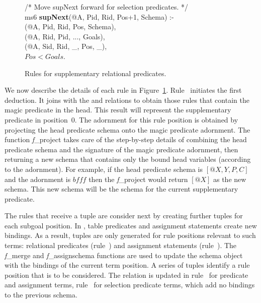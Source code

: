 \begin{figure}[!t]
\begin{boxedminipage}{\linewidth}
/* Move supNext forward for selection predicates. */ \\
ms6 {\bf supNext}(@A, Pid, Rid, Pos+1, Schema) :- \\
(@A, Pid, Rid, Pos, Schema), \\
(@A, Rid, Pid, ..., Goals), \\
(@A, Sid, Rid, \_, Pos, \_), \\
\datalogspace $Pos < Goals$. 
\end{boxedminipage}
\caption{\label{ch:magic:fig:magic2}Rules for supplementary relational predicates.}
\end{figure}

We now describe the details of each rule in Figure~\ref{ch:magic:fig:magic2}.
Rule~ initiates the first  deduction.  It joins 
with the  and  relations to obtain those rules that
contain the magic predicate in the head.  This result will represent the
supplementary predicate in position~$0$.  The adornment for this rule position
is obtained by projecting the head predicate schema onto the magic predicate
adornment.  The function {\emph f\_project} takes care of the step-by-step
details of combining the head predicate schema and the signature of the magic
predicate adornment, then returning a new schema that contains only the bound
head variables (according to the adornment).  For example, if the head
predicate schema is $[@X, Y, P, C]$ and the adornment is $bfff$ then the {\emph
f\_project} would return $[@X]$ as the new schema.  This new schema will be the
schema for the current supplementary predicate.

The rules that receive a  tuple are consider next by creating further
 tuples for each subgoal position.  In \OVERLOG, table predicates and
assignment statements create new bindings.  As a result,  tuples are
only generated for rule positions relevant to such terms: relational predicates
(rule~) and assignment statements (rule~).  The {\emph
f\_merge} and {\emph f\_assignschema} functions are used to update the schema
object with the bindings of the current term position.  A series of
 tuples identify a rule position that is to be considered.  The
 relation is updated in rule~ for predicate and assignment
terms, rule~ for selection predicate terms, which add no bindings to
the previous schema.


